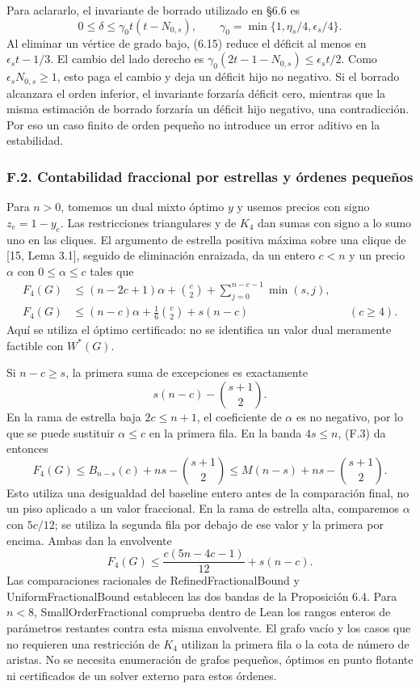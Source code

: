 \documentclass[spanish,11pt,a4paper]{article}
\begin{document}
Para aclararlo, el invariante de borrado utilizado en §6.6 es \[
0\le\delta\le\gamma_0t(t-N_{0,s}),\qquad
\gamma_0=\min\{1,\eta_s/4,\epsilon_s/4\}.
\] Al eliminar un vértice de grado bajo, (6.15) reduce el déficit al menos en \(\epsilon_s t-1/3\). El cambio del lado derecho es \(\gamma_0(2t-1-N_{0,s})\le\epsilon_s t/2\). Como \(\epsilon_sN_{0,s}\ge1\), esto paga el cambio y deja un déficit hijo no negativo. Si el borrado alcanzara el orden inferior, el invariante forzaría déficit cero, mientras que la misma estimación de borrado forzaría un déficit hijo negativo, una contradicción. Por eso un caso finito de orden pequeño no introduce un error aditivo en la estabilidad.

\subsubsection{F.2. Contabilidad fraccional por estrellas y órdenes pequeños}\label{f.2.-contabilidad-fraccional-por-estrellas-y-ordenes-pequenos}

Para \(n>0\), tomemos un dual mixto óptimo \(y\) y usemos precios con signo \(z_e=1-y_e\). Las restricciones triangulares y de \(K_4\) dan sumas con signo a lo sumo uno en las cliques. El argumento de estrella positiva máxima sobre una clique de {[}15, Lema 3.1{]}, seguido de eliminación enraizada, da un entero \(c<n\) y un precio \(\alpha\) con \(0\le\alpha\le c\) tales que \[
\begin{aligned}
F_4(G)&\le(n-2c+1)\alpha+\binom c2+
                \sum_{j=0}^{n-c-1}\min(s,j),\\
F_4(G)&\le(n-c)\alpha+\frac16\binom c2+s(n-c)
                   &&(c\ge4).
\end{aligned}
\tag{F.2}
\] Aquí se utiliza el óptimo certificado: no se identifica un valor dual meramente factible con \(W^*(G)\).

Si \(n-c\ge s\), la primera suma de excepciones es exactamente \[
s(n-c)-\binom{s+1}{2}.
\tag{F.3}
\] En la rama de estrella baja \(2c\le n+1\), el coeficiente de \(\alpha\) es no negativo, por lo que se puede sustituir \(\alpha\le c\) en la primera fila. En la banda \(4s\le n\), (F.3) da entonces \[
F_4(G)\le B_{n-s}(c)+ns-\binom{s+1}{2}
\le M(n-s)+ns-\binom{s+1}{2}.
\] Esto utiliza una desigualdad del baseline entero antes de la comparación final, no un piso aplicado a un valor fraccional. En la rama de estrella alta, comparemos \(\alpha\) con \(5c/12\); se utiliza la segunda fila por debajo de ese valor y la primera por encima. Ambas dan la envolvente \[
F_4(G)\le\frac{c(5n-4c-1)}{12}+s(n-c).
\tag{F.4}
\] Las comparaciones racionales de RefinedFractionalBound y UniformFractionalBound establecen las dos bandas de la Proposición 6.4. Para \(n<8\), SmallOrderFractional comprueba dentro de Lean los rangos enteros de parámetros restantes contra esta misma envolvente. El grafo vacío y los casos que no requieren una restricción de \(K_4\) utilizan la primera fila o la cota de número de aristas. No se necesita enumeración de grafos pequeños, óptimos en punto flotante ni certificados de un solver externo para estos órdenes.
\end{document}
